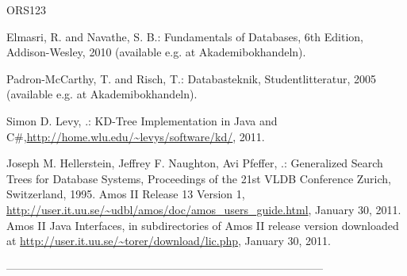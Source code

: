 \documentclass[12pt]{article}
\begin{document}

\begin{thebibliography}{ORS123}
%


 Elmasri, R. and Navathe, S. B.: Fundamentals of Databases, 6th Edition, Addison-Wesley, 2010 (available e.g. at Akademibokhandeln).

 Padron-McCarthy, T. and Risch, T.: Databasteknik, Studentlitteratur, 2005 (available e.g. at Akademibokhandeln).

 Simon D. Levy, .: KD-Tree Implementation in Java and C\#,\url{http://home.wlu.edu/~levys/software/kd/}, 2011.

 Joseph M. Hellerstein, Jeffrey F. Naughton, Avi Pfeffer, .: Generalized Search Trees for Database Systems, Proceedings of the 21st VLDB Conference Zurich, Switzerland, 1995.
 Amos II Release 13 Version 1, \url{http://user.it.uu.se/~udbl/amos/doc/amos_users_guide.html}, January 30,  2011.
 Amos II Java Interfaces, in subdirectories of Amos II release version downloaded at \url{http://user.it.uu.se/~torer/download/lic.php}, January 30,  2011.


\end{thebibliography}


%
%


\begin{center}
--------------------------------------------------------------------------------------\\
\end{center}
\end{document}
